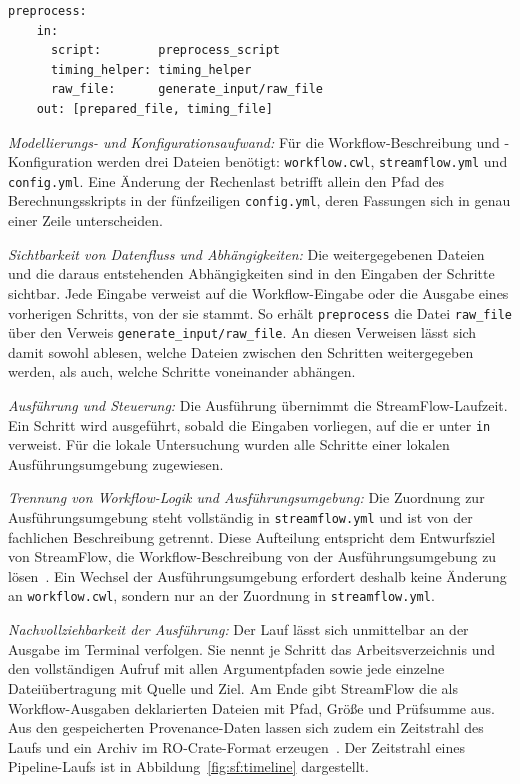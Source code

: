 \begin{lstlisting}[caption={Verweis auf die Ausgabe des Vorgängers in workflow.cwl (StreamFlow, Pipeline)},label={lst:pipe:sf}]
  preprocess:
    in:
      script:        preprocess_script
      timing_helper: timing_helper
      raw_file:      generate_input/raw_file
    out: [prepared_file, timing_file]
\end{lstlisting}

\begin{sloppypar}
\emph{Modellierungs- und Konfigurationsaufwand:} Für die
Workflow-Beschreibung und -Konfiguration werden drei Dateien
benötigt: \texttt{workflow.cwl}, \texttt{streamflow.yml} und
\texttt{config.yml}. Eine Änderung der Rechenlast betrifft allein
den Pfad des Berechnungsskripts in der fünfzeiligen
\texttt{config.yml}, deren Fassungen sich in genau einer Zeile
unterscheiden.
\end{sloppypar}

\emph{Sichtbarkeit von Datenfluss und Abhängigkeiten:} Die
weitergegebenen Dateien und die daraus entstehenden Abhängigkeiten
sind in den Eingaben der Schritte sichtbar. Jede Eingabe verweist
auf die Workflow-Eingabe oder die Ausgabe eines vorherigen Schritts,
von der sie stammt. So erhält \texttt{preprocess} die Datei
\texttt{raw\_file} über den Verweis
\texttt{generate\_input/raw\_file}. An diesen Verweisen lässt sich
damit sowohl ablesen, welche Dateien zwischen den Schritten
weitergegeben werden, als auch, welche Schritte voneinander
abhängen.

\begin{sloppypar}
\emph{Ausführung und Steuerung:} Die Ausführung übernimmt die
StreamFlow-Laufzeit. Ein Schritt wird ausgeführt, sobald die
Eingaben vorliegen, auf die er unter \texttt{in} verweist. Für die
lokale Untersuchung wurden alle Schritte einer lokalen
Ausführungsumgebung zugewiesen.
\end{sloppypar}

\emph{Trennung von Workflow-Logik und Ausführungsumgebung:} Die
Zuordnung zur Ausführungsumgebung steht vollständig in
\texttt{streamflow.yml} und ist von der fachlichen Beschreibung
getrennt. Diese Aufteilung entspricht dem Entwurfsziel von
StreamFlow, die Workflow-Beschreibung von der Ausführungsumgebung
zu lösen~\cite[S.~1723]{colonnelli2021streamflow}. Ein Wechsel der
Ausführungsumgebung erfordert deshalb keine Änderung an
\texttt{workflow.cwl}, sondern nur an der Zuordnung in
\texttt{streamflow.yml}.


\emph{Nachvollziehbarkeit der Ausführung:} Der Lauf lässt sich
unmittelbar an der Ausgabe im Terminal verfolgen. Sie nennt je Schritt
das Arbeitsverzeichnis und den vollständigen Aufruf mit allen
Argumentpfaden sowie jede einzelne Dateiübertragung mit Quelle und
Ziel. Am Ende gibt StreamFlow die als Workflow-Ausgaben deklarierten
Dateien mit Pfad, Größe und Prüfsumme aus. Aus den gespeicherten
Provenance-Daten lassen sich zudem ein Zeitstrahl des Laufs und ein
Archiv im RO-Crate-Format erzeugen~\cite{streamflowdocs-inspect}. Der
Zeitstrahl eines Pipeline-Laufs ist in
Abbildung~\ref{fig:sf:timeline} dargestellt.

